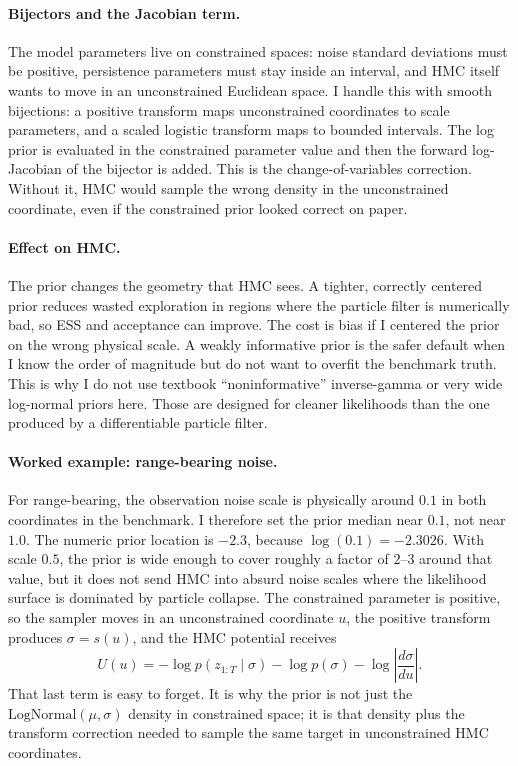 \documentclass{article}
\begin{document}
\paragraph{Bijectors and the Jacobian term.}
The model parameters live on constrained spaces: noise standard deviations must be positive, persistence parameters must stay inside an interval, and HMC itself wants to move in an unconstrained Euclidean space. I handle this with smooth bijections: a positive transform maps unconstrained coordinates to scale parameters, and a scaled logistic transform maps to bounded intervals. The log prior is evaluated in the constrained parameter value and then the forward log-Jacobian of the bijector is added. This is the change-of-variables correction. Without it, HMC would sample the wrong density in the unconstrained coordinate, even if the constrained prior looked correct on paper.

\paragraph{Effect on HMC.}
The prior changes the geometry that HMC sees. A tighter, correctly centered prior reduces wasted exploration in regions where the particle filter is numerically bad, so ESS and acceptance can improve. The cost is bias if I centered the prior on the wrong physical scale. A weakly informative prior is the safer default when I know the order of magnitude but do not want to overfit the benchmark truth. This is why I do not use textbook ``noninformative'' inverse-gamma or very wide log-normal priors here. Those are designed for cleaner likelihoods than the one produced by a differentiable particle filter.

\paragraph{Worked example: range-bearing noise.}
For range-bearing, the observation noise scale is physically around $0.1$ in both coordinates in the benchmark. I therefore set the prior median near $0.1$, not near $1.0$. The numeric prior location is $-2.3$, because $\log(0.1)=-2.3026$. With scale $0.5$, the prior is wide enough to cover roughly a factor of $2$--$3$ around that value, but it does not send HMC into absurd noise scales where the likelihood surface is dominated by particle collapse. The constrained parameter is positive, so the sampler moves in an unconstrained coordinate $u$, the positive transform produces $\sigma=s(u)$, and the HMC potential receives
\begin{equation}
    U(u) = -\log p(z_{1:T}\mid \sigma) - \log p(\sigma) - \log\left|\frac{d\sigma}{du}\right|.
\end{equation}
That last term is easy to forget. It is why the prior is not just the $\mathrm{LogNormal}(\mu,\sigma)$ density in constrained space; it is that density plus the transform correction needed to sample the same target in unconstrained HMC coordinates.
\end{document}

